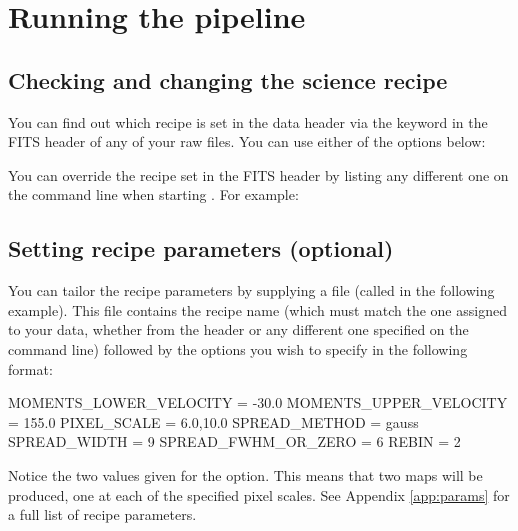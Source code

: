 \documentclass[11pt,oneside,chapters]{starlink}
\begin{document}
\clearpage
\chapter{Running the pipeline}
\label{sec:runpipe}

\section{Checking and changing the science recipe}
\label{sec:changerecipe}
You can find out which recipe is set in the data header via the
 keyword in the FITS header of any of your raw files.
You can use either of the options below:
\begin{terminalv}
\end{terminalv}

You can override the recipe set in the FITS header by listing any different
one on the command line when starting \oracdr. For example:
\begin{terminalv}
\end{terminalv}

\section{Setting recipe parameters (optional)}
\label{sec:recpars}

You can tailor the recipe parameters by supplying a  file
(called  in the following example). This file contains the
recipe name (which must match the one assigned to your data, whether
from the header or any different one specified on the command line)
followed by the options you wish to specify in the following format:

\vspace{0.2cm}
\begin{terminalv}
MOMENTS_LOWER_VELOCITY = -30.0
MOMENTS_UPPER_VELOCITY = 155.0
PIXEL_SCALE = 6.0,10.0
SPREAD_METHOD = gauss
SPREAD_WIDTH = 9
SPREAD_FWHM_OR_ZERO = 6
REBIN = 2
\end{terminalv}

Notice the two values given for the  option. This
means that two maps will be produced, one at each of the specified
pixel scales. See Appendix \ref{app:params} for a full list of recipe
parameters.
\end{document}
